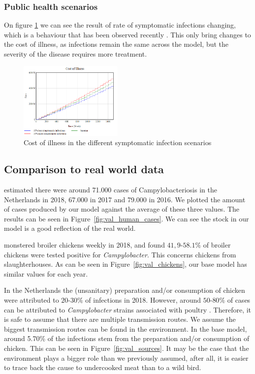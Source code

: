 \subsubsection{Public health scenarios}

On figure \ref{fig:symptom_COI} we can see the result of rate of symptomatic infections changing, which is a behaviour that has been observed recently \parencite{medema_assessment_1996}. This only bring changes to the cost of illness, as infections remain the same across the model, but the severity of the disease requires more treatment.

\begin{figure}[h!]
    \centering
    \includegraphics[width=0.45\textwidth]{images/sensitivity/Symptomatic COI.png} 
    \caption{Cost of illness in the different symptomatic infection scenarios}
    \label{fig:symptom_COI}
\end{figure}

\subsection{Comparison to real world data}

\textcite{vlaanderen_staat_2019} estimated there were around 71.000 cases of Campylobacteriosis in the Netherlands in 2018, 67.000 in 2017 and 79.000 in 2016. We plotted the amount of cases produced by our model against the average of these three values. The results can be seen in Figure~\ref{fig:val_human_cases}. We can see the stock in our model is a good reflection of the real world. 

\textcite{nepluvi_rapportage_2019} monstered broiler chickens weekly in 2018, and found $41,9$-$58.1\%$ of broiler chickens were tested positive for \textit{Campylobacter}. This concerns chickens from slaughterhouses. As can be seen in Figure~\ref{fig:val_chickens}, our base model has similar values for each year.

In the Netherlands the (unsanitary) preparation and/or consumption of chicken were attributed to $20$-$30\%$ of infections in 2018. However, around $50$-$80\%$ of cases can be attributed to \textit{Campylobacter} strains associated with poultry \parencite{cuperus_surveillance_2020, nepluvi_rapportage_2019}. Therefore, it is safe to assume that there are multiple transmission routes. We assume the biggest transmission routes can be found in the environment. In the base model, around 5.70\% of the infections stem from the preparation and/or consumption of chicken. This can be seen in Figure~\ref{fig:val_sources}. It may be the case that the environment plays a bigger role than we previously assumed, after all, it is easier to trace back the cause to undercooked meat than to a wild bird.

